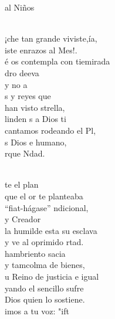 \documentclass[12pt]{article}
\begin{document}
\begin{multicols*}{2}
\begin{cancion}
	al Niños  \\\jump\\
	\begin{chorus}%
	¡che tan grande viviste,ía, \\
	iste enrazos al Mes!.\\
	é os contempla con tiemirada\\
	dro deeva \\
	y no a   \\
	s y reyes que\\
	han visto strella,\\
	linden s a Dios ti\\
	 cantamos rodeando el Pl,\\
	s Dios e humano,  \\
	rque Ndad.\\
	\end{chorus}%
	\jump\\
	te el plan \\
	que el or te planteaba\\
	 “fiat-hágase” ndicional,\\
	y   Creador \\
	la humilde esta su esclava\\
	y ve al oprimido rtad.\\
	hambriento sacia \\
	y tamcolma de bienes,\\
	u Reino de justicia e igual\\
	yando el sencillo sufre \\
	Dios quien lo sostiene.\\
	imos a tu voz: "ift \\
\end{cancion}%


\end{multicols*}
\end{document}
